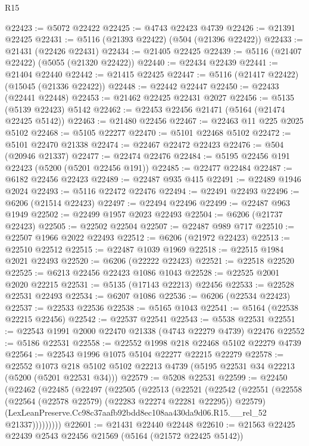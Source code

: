 \begin{lexlean}{R15}
\begin{coremodule}
{{{{{{{{{{{@22423 := @5072 @22422
@22425 := @4743 @22423 @4739
@22426 := @21391 @22425
@22431 := @5116 (@21393 @22422) (@504 (@21396 @22422))
@22433 := @21431 (@22426 @22431)
@22434 := @21405 @22425
@22439 := @5116 (@21407 @22422) (@5055 (@21320 @22422))
@22440 := @22434 @22439
@22441 := @21404 @22440
@22442 := @21415 @22425
@22447 := @5116 (@21417 @22422) (@15045 (@21336 @22422))
@22448 := @22442 @22447
@22450 := @22433 (@22441 @22448)
@22453 := @21462 @22425 @22431 @2027
@22456 := @5135 (@5139 @22423) @5142
@22462 := @22453 @22456 @21471 (@5164 (@21474 @22425 @5142))
@22463 := @21480 @22456
@22467 := @22463 @11 @225 @2025 @5102
@22468 := @5105 @22277
@22470 := @5101 @22468 @5102
@22472 := @5101 @22470 @21338
@22474 := @22467 @22472 @22423
@22476 := @504 (@20946 @21337)
@22477 := @22474 @22476
@22484 := @5195 @22456 @191 @22423 (@5200 (@5201 @22456 @191))
@22485 := @22477 @22484
@22487 := @6182 @22456 @22423
@22489 := @22487 @935 @415
@22491 := @22489 @1946 @2024
@22493 := @5116 @22472 @22476
@22494 := @22491 @22493
@22496 := @6206 (@21514 @22423)
@22497 := @22494 @22496
@22499 := @22487 @963 @1949
@22502 := @22499 @1957 @2023 @22493
@22504 := @6206 (@21737 @22423)
@22505 := @22502 @22504
@22507 := @22487 @989 @717
@22510 := @22507 @1966 @2022 @22493
@22512 := @6206 (@21972 @22423)
@22513 := @22510 @22512
@22515 := @22487 @1039 @1969
@22518 := @22515 @1984 @2021 @22493
@22520 := @6206 (@22222 @22423)
@22521 := @22518 @22520
@22525 := @6213 @22456 @22423 @1086 @1043
@22528 := @22525 @2001 @2020 @22215
@22531 := @5135 (@17143 @22213) @22456
@22533 := @22528 @22531 @22493
@22534 := @6207 @1086
@22536 := @6206 (@22534 @22423)
@22537 := @22533 @22536
@22538 := @5165 @1043
@22541 := @5164 (@22538 @22215 @22456)
@22542 := @22537 @22541
@22543 := @5538 @22531
@22551 := @22543 @1991 @2000 @22470 @21338 (@4743 @22279 @4739) @22476
@22552 := @5186 @22531
@22558 := @22552 @1998 @218 @22468 @5102 @22279 @4739
@22564 := @22543 @1996 @1075 @5104 @22277 @22215 @22279
@22578 := @22552
    @1073
    @218
    @5102
    @5102
    @22213
    @4739
    (@5195 @22531 @34 @22213 (@5200 (@5201 @22531 @34)))
@22579 := @5208 @22531
@22599 := @22450
    (@22462
      (@22485
        (@22497
          (@22505
            (@22513
              (@22521
                (@22542
                  (@22551
                    (@22558 (@22564 (@22578 @22579) (@22283 @22274 @22281 @22295)) @22579)
                    (LexLeanPreserve.Cc98c37aafb92bdd8ec108aa430da9d06.R15.__rel_52 @21337)))))))))
@22601 := @21431 @22440 @22448
@22610 := @21563 @22425 @22439 @2543 @22456 @21569 (@5164 (@21572 @22425 @5142))
}}}}}}}}}}}
\end{coremodule}
\end{lexlean}
